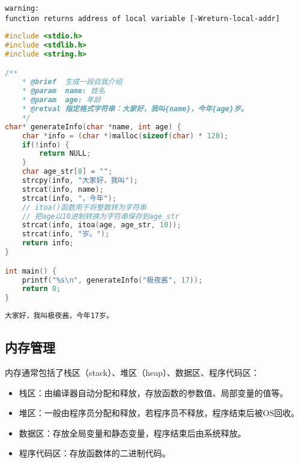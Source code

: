 \begin{tcolorbox}
    \begin{verbatim}
warning:
function returns address of local variable [-Wreturn-local-addr]
	\end{verbatim}
\end{tcolorbox}

\vspace{0.5cm}


\begin{lstlisting}[language=C]
#include <stdio.h>
#include <stdlib.h>
#include <string.h>

/**
    * @brief  生成一段自我介绍
    * @param  name: 姓名
    * @param  age: 年龄
    * @retval 指定格式字符串：大家好，我叫{name}，今年{age}岁。
    */
char* generateInfo(char *name, int age) {
    char *info = (char *)malloc(sizeof(char) * 128);
    if(!info) {
        return NULL;
    }
    char age_str[8] = "";
    strcpy(info, "大家好，我叫");
    strcat(info, name);
    strcat(info, "，今年");
    // itoa()函数用于将整数转为字符串
    // 把age以10进制转换为字符串保存到age_str
    strcat(info, itoa(age, age_str, 10));
    strcat(info, "岁。");
    return info;
}

int main() {
    printf("%s\n", generateInfo("极夜酱", 17));
    return 0;
}
\end{lstlisting}

\begin{tcolorbox}
    \begin{verbatim}
大家好，我叫极夜酱，今年17岁。
	\end{verbatim}
\end{tcolorbox}

\vspace{0.5cm}

\subsection{内存管理}

内存通常包括了栈区（stack）、堆区（heap）、数据区、程序代码区：

\begin{itemize}
    \item 栈区：由编译器自动分配和释放，存放函数的参数值、局部变量的值等。

    \item 堆区：一般由程序员分配和释放，若程序员不释放，程序结束后被OS回收。

    \item 数据区：存放全局变量和静态变量，程序结束后由系统释放。

    \item 程序代码区：存放函数体的二进制代码。
\end{itemize}

